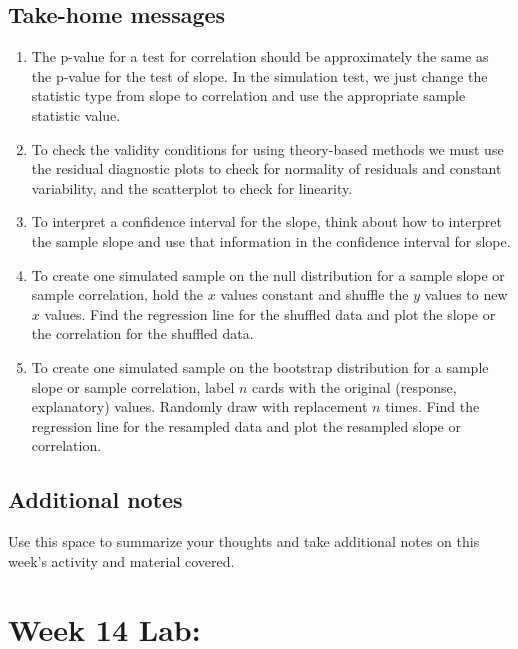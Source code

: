 \documentclass[
]{report}
\begin{document}
\vspace{1in}

\hypertarget{take-home-messages-21}{%
\subsection{Take-home messages}\label{take-home-messages-21}}

\begin{enumerate}
\def\labelenumi{\arabic{enumi}.}
\item
  The p-value for a test for correlation should be approximately the same as the p-value for the test of slope. In the simulation test, we just change the statistic type from slope to correlation and use the appropriate sample statistic value.
\item
  To check the validity conditions for using theory-based methods we must use the residual diagnostic plots to check for normality of residuals and constant variability, and the scatterplot to check for linearity.
\item
  To interpret a confidence interval for the slope, think about how to interpret the sample slope and use that information in the confidence interval for slope.
\item
  To create one simulated sample on the null distribution for a sample slope or sample correlation, hold the \(x\) values constant and shuffle the \(y\) values to new \(x\) values. Find the regression line for the shuffled data and plot the slope or the correlation for the shuffled data.
\item
  To create one simulated sample on the bootstrap distribution for a sample slope or sample correlation, label \(n\) cards with the original (response, explanatory) values. Randomly draw with replacement \(n\) times. Find the regression line for the resampled data and plot the resampled slope or correlation.
\end{enumerate}

\hypertarget{additional-notes-18}{%
\subsection{Additional notes}\label{additional-notes-18}}

Use this space to summarize your thoughts and take additional notes on this week's activity and material covered.

\newpage

\hypertarget{week-14-lab}{%
\section{Week 14 Lab:}\label{week-14-lab}}
\end{document}
